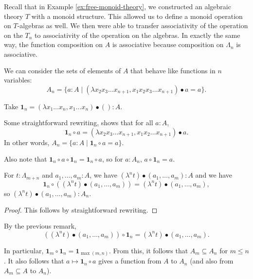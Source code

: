 \begin{remark}
  Recall that in Example \ref{ex:free-monoid-theory}, we constructed an algebraic theory $ T $ with a monoid structure. This allowed us to define a monoid operation on $ T $-algebras as well. We then were able to transfer associativity of the operation on the $ T_n $ to associativity of the operation on the algebras. In exactly the same way, the function composition on $ A $ is associative because composition on $ \Lambda_n $ is associative.
\end{remark}

\begin{definition}
  We can consider the sets of elements of $ A $ that behave like functions in $ n $ variables:
  \[ A_n = \{ a : A \mid (\lambda x_2 x_3 \dots x_{n + 1}, x_1 x_2 x_3 \dots x_{n + 1}) \bullet a = a \}. \]
\end{definition}

\begin{definition}
  Take $ \mathbf 1_n = (\lambda x_1 \dots x_n, x_1 \dots x_n) \bullet () : A $.
\end{definition}

\begin{remark}
  Some straightforward rewriting, shows that for all $ a : A $,
  \[ \mathbf 1_n \circ a = (\lambda x_2 x_3 \dots x_{n + 1}, x_1 x_2 \dots x_{n + 1}) \bullet a. \]
  In other words, $ A_n = \{ a : A \mid \mathbf 1_n \circ a = a \} $.
\end{remark}

\begin{remark}
  Also note that $ \mathbf 1_n \circ a \circ \mathbf 1_n = \mathbf 1_n \circ a $, so for $ a : A_n $, $ a \circ \mathbf 1_n = a $.
\end{remark}

\begin{lemma}
  For $ t: \Lambda_{m + n} $ and $ a_1, \dots, a_m: A $, we have $ (\lambda^n t) \bullet (a_1, \dots, a_m) : A $ and we have
  \[ \mathbf 1_n \circ ((\lambda^n t) \bullet (a_1, \dots, a_m)) = (\lambda^n t) \bullet (a_1, \dots, a_m), \]
  so $ (\lambda^n t) \bullet (a_1, \dots, a_m) : A_n $.
\end{lemma}
\begin{proof}
  This follows by straightforward rewriting.
\end{proof}

\begin{corollary}
  By the previous remark,
  \[ ((\lambda^n t) \bullet (a_1, \dots, a_m)) \circ \mathbf 1_n = (\lambda^n t) \bullet (a_1, \dots, a_m). \]
\end{corollary}
\begin{corollary}
  In particular, $ \mathbf 1_m \circ \mathbf 1_n = \mathbf 1_{\max(m, n)} $. From this, it follows that $ A_m \subseteq A_n $ for $ m \leq n $. It also follows that $ a \mapsto \mathbf 1_n \circ a $ gives a function from $ A $ to $ A_n $ (and also from $ A_m \subseteq A $ to $ A_n $).
\end{corollary}


